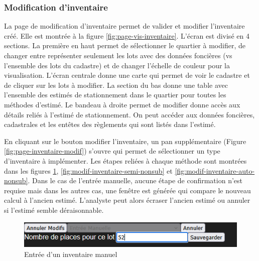 \subsubsection{Modification d'inventaire}
La page de modification d'inventaire permet de valider et modifier l'inventaire créé. Elle est montrée à la figure \ref{fig:page-vis-inventaire}. L'écran est divisé en 4 sections. La première en haut permet de sélectionner le quartier à modifier, de changer entre représenter seulement les lots avec des données foncières (vs l'ensemble des lots du cadastre) et de changer l'échelle de couleur pour la visualisation. L'écran centrale donne une carte qui permet de voir le cadastre et de cliquer sur les lots à modifier. La section du bas donne une table avec l'ensemble des estimés de stationnement dans le quartier pour toutes les méthodes d'estimé. Le bandeau à droite permet de modifier donne accès aux détails reliés à l'estimé de stationnement. On peut accéder aux données foncières, cadastrales et les entêtes des règlements qui sont listés dans l'estimé.\par
En cliquant sur le bouton modifier l'inventaire, un pan supplémentaire (Figure \ref{fig:page-inventaire-modif}) s'ouvre qui permet de sélectionner un type d'inventaire à implémenter. Les étapes reliées à chaque méthode sont montrées dans les figures \ref{fig:modif-inventaire-manuel}, \ref{fig:modif-inventaire-semi-nonsub} et \ref{fig:modif-inventaire-auto-nonsub}. Dans le cas de l'entrée manuelle, aucune étape de confirmation n'est requise mais dans les autres cas, une fenêtre est générée qui compare le nouveau calcul à l'ancien estimé. L'analyste peut alors écraser l'ancien estimé ou annuler si l'estimé semble déraisonnable. \par
\begin{figure}[h]
        \centering
        \includegraphics[width=0.5\linewidth]{images/ModifInventaireManuelle.png}
        \caption{Entrée d'un inventaire manuel}
        \label{fig:modif-inventaire-manuel}
\end{figure}  
